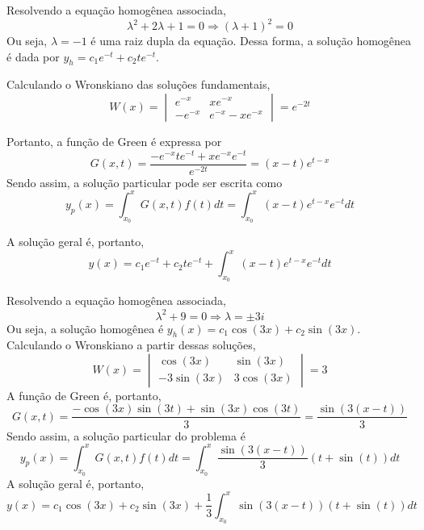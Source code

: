 \documentclass[oneside,12pt,a4paper]{report}
\begin{document}
\begin{resolucao}
    \itemresolucao Resolvendo a equação homogênea associada,
    \[\lambda^2+2\lambda+1=0\Rightarrow(\lambda+1)^2=0\]
    Ou seja, $\lambda=-1$ é uma raiz dupla da equação. Dessa forma, a solução homogênea é dada por $y_h=c_1e^{-t}+c_2te^{-t}$.

    Calculando o Wronskiano das soluções fundamentais,
    \[W(x)=\begin{vmatrix}
        e^{-x}      & xe^{-x}\\
        -e^{-x} & e^{-x}-xe^{-x}
    \end{vmatrix}=e^{-2t}\]

    Portanto, a função de Green é expressa por
    \[G(x,t)=\frac{-e^{-x}te^{-t}+xe^{-x}e^{-t}}{e^{-2t}}=(x-t)e^{t-x}\]
    Sendo assim, a solução particular pode ser escrita como
    \[y_p(x)=\int_{x_0}^{x}G(x,t)f(t)dt=\int_{x_0}^{x}(x-t)e^{t-x}e^{-t}dt\]

    A solução geral é, portanto,
    \[\boxed{y(x)=c_1e^{-t}+c_2te^{-t}+\int_{x_0}^{x}(x-t)e^{t-x}e^{-t}dt}\]

    \itemresolucao Resolvendo a equação homogênea associada,
    \[\lambda^2+9=0\Rightarrow\lambda=\pm3i\]
    Ou seja, a solução homogênea é $y_h(x)=c_1\cos(3x)+c_2\sin(3x)$. Calculando o Wronskiano a partir dessas soluções,
    \[W(x)=\begin{vmatrix}
        \cos(3x)      & \sin(3x)\\
        -3\sin(3x) & 3\cos(3x)
    \end{vmatrix}=3\]
    A função de Green é, portanto,
    \[G(x, t)=\frac{-\cos(3x)\sin(3t)+\sin(3x)\cos(3t)}{3}=\frac{\sin(3(x-t))}{3}\]
    Sendo assim, a solução particular do problema é
    \[y_p(x)=\int_{x_0}^{x}G(x,t)f(t)dt=\int_{x_0}^{x}\frac{\sin(3(x-t))}{3}(t+\sin(t))dt\]
    A solução geral é, portanto,
    \[\boxed{y(x)=c_1\cos(3x)+c_2\sin(3x)+\frac{1}{3}\int_{x_0}^{x}\sin(3(x-t))(t+\sin(t))dt}\]
    \end{resolucao}
\end{document}
